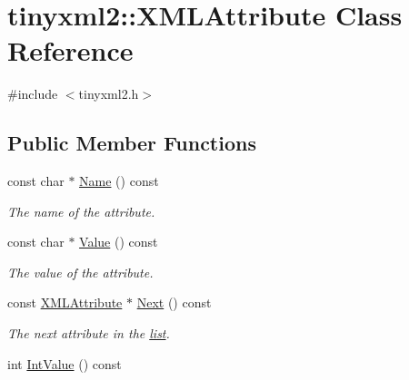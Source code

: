 \hypertarget{classtinyxml2_1_1XMLAttribute}{}\section{tinyxml2\+:\+:X\+M\+L\+Attribute Class Reference}
\label{classtinyxml2_1_1XMLAttribute}


{\ttfamily \#include $<$tinyxml2.\+h$>$}

\subsection*{Public Member Functions}
\begin{DoxyCompactItemize}
\item 
\mbox{\label{classtinyxml2_1_1XMLAttribute_ab886c486ec19f02ed826f8dc129e5ad8}} 
const char $\ast$ \hyperlink{classtinyxml2_1_1XMLAttribute_ab886c486ec19f02ed826f8dc129e5ad8}{Name} () const
\begin{DoxyCompactList}\small\item\em The name of the attribute. \end{DoxyCompactList}\item 
\mbox{\label{classtinyxml2_1_1XMLAttribute_a1aab1dd0e43ecbcfa306adbcf3a3d853}} 
const char $\ast$ \hyperlink{classtinyxml2_1_1XMLAttribute_a1aab1dd0e43ecbcfa306adbcf3a3d853}{Value} () const
\begin{DoxyCompactList}\small\item\em The value of the attribute. \end{DoxyCompactList}\item 
\mbox{\label{classtinyxml2_1_1XMLAttribute_aee53571b21e7ce5421eb929523a8bbe6}} 
const \hyperlink{classtinyxml2_1_1XMLAttribute}{X\+M\+L\+Attribute} $\ast$ \hyperlink{classtinyxml2_1_1XMLAttribute_aee53571b21e7ce5421eb929523a8bbe6}{Next} () const
\begin{DoxyCompactList}\small\item\em The next attribute in the \hyperlink{protocollist-p}{list}. \end{DoxyCompactList}\item 
int \hyperlink{classtinyxml2_1_1XMLAttribute_adfa2433f0fdafd5c3880936de9affa80}{Int\+Value} () const
\item 

\end{DoxyCompactItemize}
